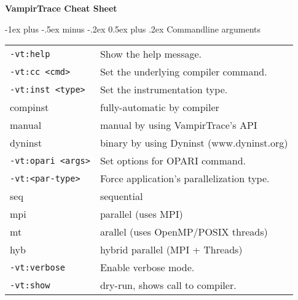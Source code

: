 \documentclass[a4paper,10pt,landscape]{article}
\makeatletter
\renewcommand{\section}{\@startsection{section}{1}{0mm}%
                                {-1ex plus -.5ex minus -.2ex}%
                                {0.5ex plus .2ex}%
                                {\normalfont\large\bfseries}}
\makeatother
\begin{document}
\raggedright
\footnotesize
\begin{multicols}{3}


\setlength{\premulticols}{1pt}
\setlength{\postmulticols}{1pt}
\setlength{\multicolsep}{1pt}
\setlength{\columnsep}{2pt}

\begin{center}
     \Large{\textbf{VampirTrace Cheat Sheet}} \\
\end{center}

\section{Commandline arguments}
\begin{tabular}{@{}ll@{}}
\texttt{-vt:help}            & Show the help message.\\
\texttt{-vt:cc  <cmd>}       & Set the underlying compiler command.\\
\texttt{-vt:inst <type>}     & Set the instrumentation type.\\
\hspace{5ex} compinst          & fully-automatic by compiler\\
\hspace{5ex} manual            & manual by using VampirTrace's API\\
\hspace{5ex} dyninst           & binary by using Dyninst (www.dyninst.org) \\
\texttt{-vt:opari <args>}    & Set options for OPARI command.\\
\texttt{-vt:<par-type>}      & Force application's parallelization type.\\
\hspace{5ex} seq               & sequential\\
\hspace{5ex} mpi               & parallel (uses MPI)\\
\hspace{5ex} mt                & arallel (uses OpenMP/POSIX threads)\\
\hspace{5ex} hyb               & hybrid parallel (MPI + Threads)\\
\texttt{-vt:verbose}         & Enable verbose mode.\\
\texttt{-vt:show}            & dry-run, shows call to compiler.
\end{tabular}


\end{multicols}
\end{document}
